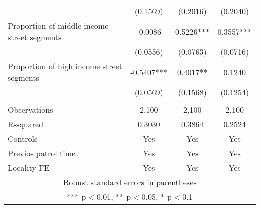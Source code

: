 \documentclass[]{article}
\begin{document}
\begin{tabular}{lccc}
 & (0.1569) & (0.2016) & (0.2040) \\
Proportion of middle income street segments & -0.0086 & 0.5226*** & 0.3557*** \\
 & (0.0556) & (0.0763) & (0.0716) \\
Proportion of high income street segments & -0.5407*** & 0.4017** & 0.1240 \\
 & (0.0569) & (0.1568) & (0.1254) \\
 &  &  &  \\
Observations & 2,100 & 2,100 & 2,100 \\
R-squared & 0.3030 & 0.3864 & 0.2524 \\
Controls & Yes & Yes & Yes \\
Previos patrol time & Yes & Yes & Yes \\
 Locality FE & Yes & Yes & Yes \\ \hline
\multicolumn{4}{c}{ Robust standard errors in parentheses} \\
\multicolumn{4}{c}{ *** p$<$0.01, ** p$<$0.05, * p$<$0.1} \\
\end{tabular}
\end{document}
